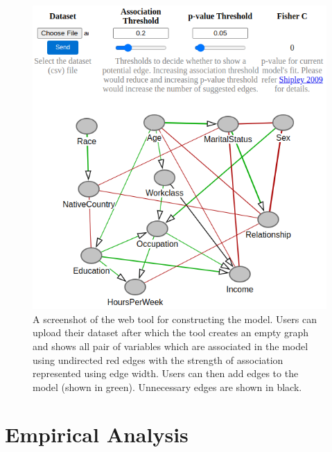 \documentclass{uai2025} %
\begin{document}
\begin{figure}[t!]
	\centering
	\includegraphics[scale=0.4]{../code/plots/web_tool_full.png}
	\caption{A screenshot of the web tool for constructing the model. Users
		can upload their dataset after which the tool creates an empty
		graph and shows all pair of variables which are associated in
		the model using undirected red edges with the strength of
		association represented using edge width. Users can then add
		edges to the model (shown in green). Unnecessary edges are shown in 
		black.}
	\label{fig:web}
\end{figure}


\section{Empirical Analysis}
\label{sec:empirical}
\end{document}

